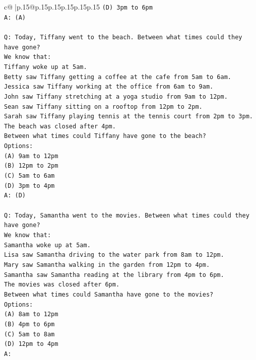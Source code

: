 \documentclass{article}
\begin{document}
{\begin{supertabular}{c@{$\;$}|p{.15\linewidth}@{}p{.15\linewidth}p{.15\linewidth}p{.15\linewidth}p{.15\linewidth}p{.15\linewidth}}
{{{\texttt{(D) 3pm to 6pm} \\
\texttt{A: (A)} \\
\\ 
\texttt{Q: Today, Tiffany went to the beach. Between what times could they have gone?} \\
\texttt{We know that:} \\
\texttt{Tiffany woke up at 5am.} \\
\texttt{Betty saw Tiffany getting a coffee at the cafe from 5am to 6am.} \\
\texttt{Jessica saw Tiffany working at the office from 6am to 9am.} \\
\texttt{John saw Tiffany stretching at a yoga studio from 9am to 12pm.} \\
\texttt{Sean saw Tiffany sitting on a rooftop from 12pm to 2pm.} \\
\texttt{Sarah saw Tiffany playing tennis at the tennis court from 2pm to 3pm.} \\
\texttt{The beach was closed after 4pm.} \\
\texttt{Between what times could Tiffany have gone to the beach?} \\
\texttt{Options:} \\
\texttt{(A) 9am to 12pm} \\
\texttt{(B) 12pm to 2pm} \\
\texttt{(C) 5am to 6am} \\
\texttt{(D) 3pm to 4pm} \\
\texttt{A: (D)} \\
\\ 
\texttt{Q: Today, Samantha went to the movies. Between what times could they have gone?} \\
\texttt{We know that:} \\
\texttt{Samantha woke up at 5am.} \\
\texttt{Lisa saw Samantha driving to the water park from 8am to 12pm.} \\
\texttt{Mary saw Samantha walking in the garden from 12pm to 4pm.} \\
\texttt{Samantha saw Samantha reading at the library from 4pm to 6pm.} \\
\texttt{The movies was closed after 6pm.} \\
\texttt{Between what times could Samantha have gone to the movies?} \\
\texttt{Options:} \\
\texttt{(A) 8am to 12pm} \\
\texttt{(B) 4pm to 6pm} \\
\texttt{(C) 5am to 8am} \\
\texttt{(D) 12pm to 4pm} \\
\texttt{A:} \\
            }
        }
    }
     \\ \\


\end{supertabular}}
\end{document}

